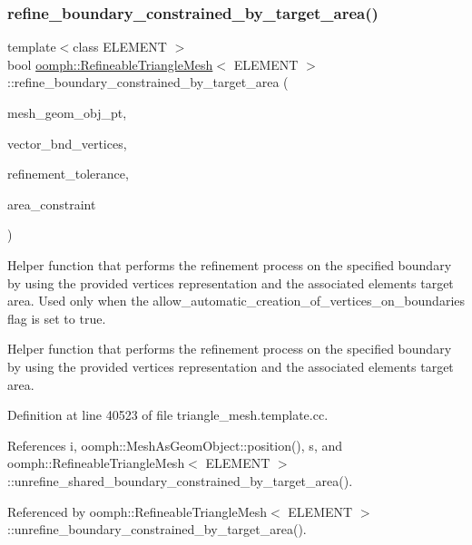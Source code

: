 \subsubsection{\texorpdfstring{refine\+\_\+boundary\+\_\+constrained\+\_\+by\+\_\+target\+\_\+area()}{refine\_boundary\_constrained\_by\_target\_area()}}
{\footnotesize\ttfamily template$<$class E\+L\+E\+M\+E\+NT $>$ \\
bool \hyperlink{classoomph_1_1RefineableTriangleMesh}{oomph\+::\+Refineable\+Triangle\+Mesh}$<$ E\+L\+E\+M\+E\+NT $>$\+::refine\+\_\+boundary\+\_\+constrained\+\_\+by\+\_\+target\+\_\+area (\begin{DoxyParamCaption}\item[{\hyperlink{classoomph_1_1MeshAsGeomObject}{Mesh\+As\+Geom\+Object} $\ast$}]{mesh\+\_\+geom\+\_\+obj\+\_\+pt,  }\item[{\hyperlink{classoomph_1_1Vector}{Vector}$<$ \hyperlink{classoomph_1_1Vector}{Vector}$<$ double $>$ $>$ \&}]{vector\+\_\+bnd\+\_\+vertices,  }\item[{double \&}]{refinement\+\_\+tolerance,  }\item[{\hyperlink{classoomph_1_1Vector}{Vector}$<$ double $>$ \&}]{area\+\_\+constraint }\end{DoxyParamCaption})\hspace{0.3cm}{\ttfamily [protected]}}



Helper function that performs the refinement process on the specified boundary by using the provided vertices representation and the associated elements target area. Used only when the \textquotesingle{}allow\+\_\+automatic\+\_\+creation\+\_\+of\+\_\+vertices\+\_\+on\+\_\+boundaries\textquotesingle{} flag is set to true. 

Helper function that performs the refinement process on the specified boundary by using the provided vertices representation and the associated elements target area. 

Definition at line 40523 of file triangle\+\_\+mesh.\+template.\+cc.



References i, oomph\+::\+Mesh\+As\+Geom\+Object\+::position(), s, and oomph\+::\+Refineable\+Triangle\+Mesh$<$ E\+L\+E\+M\+E\+N\+T $>$\+::unrefine\+\_\+shared\+\_\+boundary\+\_\+constrained\+\_\+by\+\_\+target\+\_\+area().



Referenced by oomph\+::\+Refineable\+Triangle\+Mesh$<$ E\+L\+E\+M\+E\+N\+T $>$\+::unrefine\+\_\+boundary\+\_\+constrained\+\_\+by\+\_\+target\+\_\+area().

